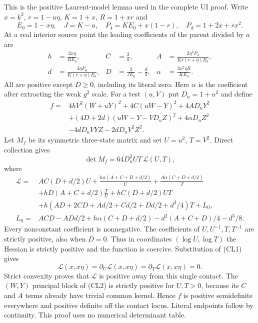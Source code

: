 This is the positive Laurent-model lemma used in the complete UI proof.
Write $x=k^2$, $r=1-a\eta$, $K=1+x$, $R=1+xr$ and
\[
 E_0=1-x\eta,\quad J=K-a,\quad
 P_4=KE_0+x(1-r),\quad P_d=1+2x+rx^2.
\]
At a real interior source point the leading coefficients of the
parent divided by $a$ are
\[
\begin{aligned}
 h&=\frac{2x\eta}{RE_0},& C&=\frac2a,&
 A&=\frac{2\eta^2P_4}{Kr(r+\eta)E_0},\\
 d&=\frac{4\eta P_d}{K(r+\eta)E_0},&
 D&=\frac2{JE_0}-\frac d2,&
 \alpha&=\frac{2x^2\eta R}{KE_0}.
\end{aligned}                                                     \tag{CL1}
\]
All are positive except $D\ge0$, including its literal zero. Here
$\alpha$ is the coefficient after extracting the weak $g^2$ scale.
For a test $(u,V)$ put $D_u=1+u^2$ and define
\begin{align*}
f={}&4hV^2(W+uY)^2+4C(uW-Y)^2+4AD_uY^2\\
 &+(4D+2d)(uW-Y-VD_uZ)^2+4\alpha D_uZ^2\\
 &-4dD_uVYZ-2dD_uV^2Z^2.                           \tag{CL2}
\end{align*}
Let $M_f$ be its symmetric three-state matrix and set $U=u^2$, $T=V^2$.
Direct collection gives
\[
 \det M_f=64D_u^2UT\,\mathcal L(U,T),                 \tag{CL3}
\]
where
\begin{align*}
\mathcal L={}&AC(D+d/2)U+
 \frac{h\alpha(A+C+D+d/2)}U+\frac{A\alpha(C+D+d/2)}T\\
 &+hD(A+C+d/2)\frac TU+hC(D+d/2)UT\\
 &+h(AD+2CD+Ad/2+Cd/2+Dd/2+d^2/4)T+L_0,\\
L_0={}&ACD-ADd/2+h\alpha(C+D+d/2)
                         -d^2(A+C+D)/4-d^3/8.       \tag{CL4}
\end{align*}
Every nonconstant coefficient is nonnegative. The coefficients of
$U,U^{-1},T,T^{-1}$ are strictly positive, also when $D=0$.
Thus in coordinates $(\log U,\log T)$ the Hessian is strictly
positive and the function is coercive. Substitution of (CL1) gives
\[
 \mathcal L(x,x\eta)=\partial_U\mathcal L(x,x\eta)
                   =\partial_T\mathcal L(x,x\eta)=0. \tag{CL5}
\]
Strict convexity proves that $\mathcal L$ is positive away from this
single contact. The $(W,Y)$ principal block of (CL2) is strictly
positive for $U,T>0$, because its $C$ and $A$ terms already have
trivial common kernel. Hence $f$ is positive semidefinite everywhere
and positive definite off the contact locus. Literal endpoints follow
by continuity. This proof uses no numerical determinant table.

